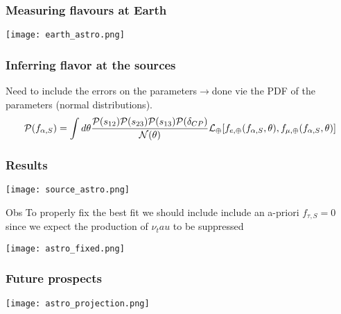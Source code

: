 \documentclass{beamer}
\begin{document}
	\begin{frame}
		\frametitle{Measuring flavours at Earth}
		\begin{center}
			\texttt{[image: earth\_astro.png]}
		\end{center}
	\end{frame}
	\begin{frame}
		\frametitle{Inferring flavor at the sources}
		Need to include the errors on the parameters$\rightarrow$done vie the PDF of the parameters (normal distributions).
		$$\displaystyle\mathcal{P}(f_{\alpha,S})=\int d\theta{\mathcal{P}(s_{12})\mathcal{P}(s_{23})\mathcal{P}(s_{13})\mathcal{P}(\delta_{CP})\over \mathcal{N}(\theta)}\mathcal{L}_\oplus[f_{e,\oplus}(f_{\alpha,S},\theta),f_{\mu,\oplus}(f_{\alpha,S},\theta)]$$
	\end{frame}
	\begin{frame}
		\frametitle{Results}
		\begin{center}
				\texttt{[image: source\_astro.png]}
		\end{center}
	\end{frame}
	\begin{frame}
		\begin{alertblock}{Obs}
			To properly fix the best fit we should include include an a-priori $f_{\tau,S}=0$ since we expect the production of $\nu_tau$ to be suppressed
		\end{alertblock}
		\begin{center}
			\texttt{[image: astro\_fixed.png]}
		\end{center}
	\end{frame}
	\begin{frame}
		\frametitle{Future prospects}
	\begin{center}
		\texttt{[image: astro\_projection.png]}
	\end{center}
	\end{frame}
\end{document}
